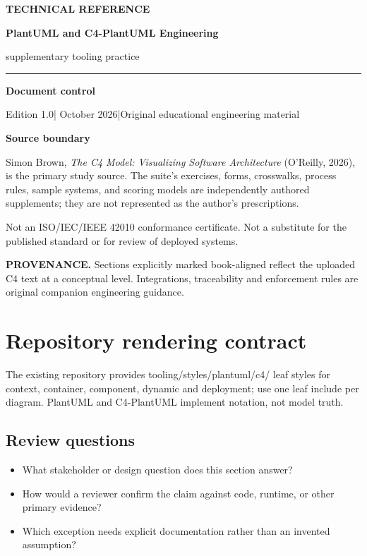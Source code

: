 \documentclass[10pt,letterpaper]{article}
\newcommand{\SourceNote}[1]{\par\smallskip\noindent\colorbox{C4Light}{\parbox{0.94\linewidth}{\footnotesize\textbf{PROVENANCE.} #1}}\par\medskip}
\newcommand{\DocStart}[3]{%
\begin{document}
\begin{titlepage}
\renewcommand{\thepage}{title-\arabic{page}}
\vspace*{0.55in}
{\sffamily\bfseries\small\color{C4Teal}#1}\par\vspace{0.24in}
{\sffamily\bfseries\fontsize{26}{31}\selectfont\color{C4Navy}#2}\par\vspace{0.18in}
{\large\color{C4Gray}#3}\par\vspace{0.4in}
\textcolor{C4Teal}{\rule{\linewidth}{1.15pt}}\par\vspace{0.24in}
\textbf{Document control}\par
Edition 1.0\quad|\quad 30 October 2026\quad|\quad Original educational engineering material\par
\vspace{0.17in}
\textbf{Source boundary}\par
Simon Brown, \emph{The C4 Model: Visualizing Software Architecture} (O'Reilly, 2026), is the primary study source. The suite's exercises, forms, crosswalks, process rules, sample systems, and scoring models are independently authored supplements; they are not represented as the author's prescriptions.\par
\vfill
{\small\color{C4Gray}Not an ISO/IEC/IEEE 42010 conformance certificate. Not a substitute for the published standard or for review of deployed systems.}\par
\end{titlepage}
}
\DocStart{TECHNICAL REFERENCE}{PlantUML and C4-PlantUML Engineering}{supplementary tooling practice}
\tableofcontents\clearpage
\SourceNote{Sections explicitly marked book-aligned reflect the uploaded C4 text at a conceptual level. Integrations, traceability and enforcement rules are original companion engineering guidance.}
\section{Repository rendering contract}
The existing repository provides tooling/styles/plantuml/c4/ leaf styles for context, container, component, dynamic and deployment; use one leaf include per diagram. PlantUML and C4-PlantUML implement notation, not model truth.


\subsection{Review questions}
\begin{itemize}
\item What stakeholder or design question does this section answer?
\item How would a reviewer confirm the claim against code, runtime, or other primary evidence?
\item Which exception needs explicit documentation rather than an invented assumption?
\end{itemize}
\end{document}
